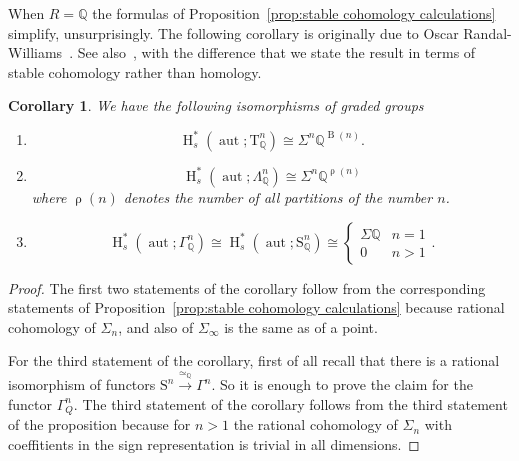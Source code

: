 \documentclass[psamsfonts]{amsart}
\theoremstyle{plain}
\newtheorem{cor}[thm]{Corollary}
\theoremstyle{definition}
\theoremstyle{remark}
\newcommand{\Q}{\mathbb{Q}}
\newcommand{\aut}{\operatorname{aut}}
\newcommand{\HH}{\operatorname{H}} %
\newcommand{\tensor}{\mathrm{T}}
\newcommand{\symm}{\mathrm{S}}
\DeclareMathOperator{\Part}{\rho}
\DeclareMathOperator{\Bell}{B}
\begin{document}
When $R=\Q$ the formulas of Proposition~\ref{prop:stable cohomology calculations} simplify, unsurprisingly. The following corollary is originally due to Oscar Randal-Williams~\cite[Theorem A (ii) and Corollary D]{RW18}. See also~\cite[Theorem 4]{Vespa2018}, with the difference that we state the result in terms of stable cohomology rather than homology. 
\begin{cor}\label{cor:rational stable cohomology}
We have the following isomorphisms of graded groups
  \begin{enumerate}
      \item \[
      \HH^*_s(\aut; \tensor^n_{\Q})\cong \Sigma^n\Q^{\Bell(n)}.
      \] 
  \item\[
   \HH^*_s(\aut; \Lambda^n_{\Q}) \cong \Sigma^n \Q^{\Part(n)}  
  \]
  where $\Part(n)$ denotes the number of all partitions of the number $n$.
  \item
  \[
    \HH^*_s(\aut; \Gamma^n_{\Q}) \cong \HH^*_s(\aut; \symm^n_{\Q})\cong \left\{\begin{array}{cc}
        \Sigma\Q & n=1 \\
        0 & n>1
    \end{array}\right. .
  \]
   \end{enumerate} 
\end{cor}
\begin{proof}
  The first two statements of the corollary follow from the corresponding statements of Proposition~\ref{prop:stable cohomology calculations} because rational cohomology of $\Sigma_n$, and also of $\Sigma_\infty$ is the same as of a point.

For the third statement of the corollary, first of all recall that there is a rational isomorphism of functors $\symm^n \xrightarrow{\simeq_{\Q}} \Gamma^n$. So it is enough to prove the claim for the functor $\Gamma^n_Q$. The third statement of the corollary follows from the third statement of the proposition because for $n>1$ the rational cohomology of $\Sigma_n$ with coeffitients in the sign representation is trivial in all dimensions. 
\end{proof}
\end{document}
